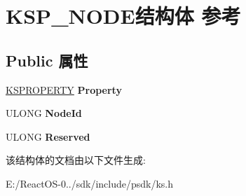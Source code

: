 \hypertarget{struct_k_s_p___n_o_d_e}{}\section{K\+S\+P\+\_\+\+N\+O\+D\+E结构体 参考}
\label{struct_k_s_p___n_o_d_e}
\subsection*{Public 属性}
\begin{DoxyCompactItemize}
\item 
\mbox{\label{struct_k_s_p___n_o_d_e_a0e2b497a39af6ec103993e2b548a9069}} 
\hyperlink{struct_k_s_i_d_e_n_t_i_f_i_e_r}{K\+S\+P\+R\+O\+P\+E\+R\+TY} {\bfseries Property}
\item 
\mbox{\label{struct_k_s_p___n_o_d_e_ac0d2a45bb00826c5b325bd19ddd0df7d}} 
U\+L\+O\+NG {\bfseries Node\+Id}
\item 
\mbox{\label{struct_k_s_p___n_o_d_e_abd97f57056040865bdf319f9a43030c7}} 
U\+L\+O\+NG {\bfseries Reserved}
\end{DoxyCompactItemize}


该结构体的文档由以下文件生成\+:\begin{DoxyCompactItemize}
\item 
E\+:/\+React\+O\+S-\/0../sdk/include/psdk/ks.\+h\end{DoxyCompactItemize}
